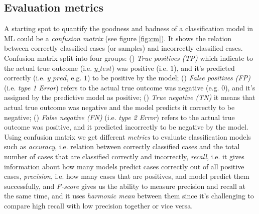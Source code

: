 \subsection{ Evaluation metrics} \label{auc}
A starting spot to quantify the goodness and badness of a classification model in ML could be a \textit{confusion matrix} (see figure \ref{fig:cm}). It shows the relation between correctly classified cases (or samples) and incorrectly classified cases. Confusion matrix split into four groups: () \textit{True positives (TP)} which indicate to the actual true outcome (i.e. $y\_test$) was positive (i.e. $1$), and it’s predicted correctly (i.e. $y\_pred$, e.g. $1$) to be positive by the model; () \textit{False positives (FP)} (i.e. \textit{type 1 Error}) refers to the actual true outcome was negative (e.g. $0$), and it’s assigned by the predictive model as positive; () \textit{True negative (TN)} it means that actual true outcome was negative and the model predicts it correctly to be negative; () \textit{False negative (FN)} (i.e. \textit{type 2 Error}) refers to the actual true outcome was positive, and it predicted incorrectly to be negative by the model. Using confusion matrix we get different \textit{metrics} to evaluate classification models such as \textit{accuracy}, i.e. relation between correctly classified cases and the total number of cases that are classified correctly and incorrectly, \textit{recall}, i.e. it gives information about how many models predict cases correctly out of all positive cases, \textit{precision}, i.e. how many cases that are positives, and model predict them successfully, and \textit{F-score} gives us the ability to measure precision and recall at the same time, and it uses \textit{harmonic mean} between them since it’s challenging to compare high recall with low precision together or vice versa.

